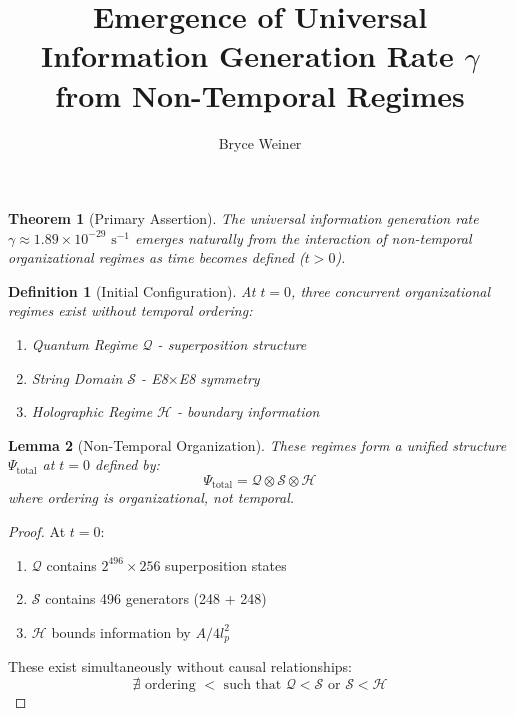 \documentclass{article}
\newtheorem{theorem}{Theorem}
\newtheorem{lemma}[theorem]{Lemma}
\newtheorem{definition}{Definition}
\begin{document}
\title{Emergence of Universal Information Generation Rate $\gamma$ from Non-Temporal Regimes}
\author{Bryce Weiner}
\maketitle

\begin{theorem}[Primary Assertion]
The universal information generation rate $\gamma \approx 1.89 \times 10^{-29} \text{ s}^{-1}$ emerges naturally from the interaction of non-temporal organizational regimes as time becomes defined ($t > 0$).
\end{theorem}

\begin{definition}[Initial Configuration]
At $t=0$, three concurrent organizational regimes exist without temporal ordering:
\begin{enumerate}
    \item Quantum Regime $\mathcal{Q}$ - superposition structure
    \item String Domain $\mathcal{S}$ - E8$\times$E8 symmetry
    \item Holographic Regime $\mathcal{H}$ - boundary information
\end{enumerate}
\end{definition}

\begin{lemma}[Non-Temporal Organization]
These regimes form a unified structure $\Psi_{\text{total}}$ at $t=0$ defined by:
\begin{equation}
\Psi_{\text{total}} = \mathcal{Q} \otimes \mathcal{S} \otimes \mathcal{H}
\end{equation}
where ordering is organizational, not temporal.
\end{lemma}

\begin{proof}
At $t=0$:
\begin{enumerate}
    \item $\mathcal{Q}$ contains $2^{496} \times 256$ superposition states
    \item $\mathcal{S}$ contains 496 generators (248 + 248)
    \item $\mathcal{H}$ bounds information by $A/4l_{p}^2$
\end{enumerate}

These exist simultaneously without causal relationships:
\begin{equation}
\nexists \text{ ordering } < \text{ such that } \mathcal{Q} < \mathcal{S} \text{ or } \mathcal{S} < \mathcal{H}
\end{equation}
\end{proof}
\end{document}
